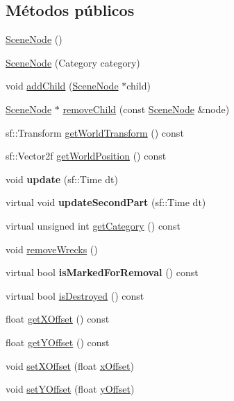 \subsection*{Métodos públicos}
\begin{DoxyCompactItemize}
\item 
\hyperlink{classSceneNode_acc2e7940323560ba86dad8e2d6eb6690}{Scene\+Node} ()
\item 
\hyperlink{classSceneNode_af87e82dcbe9fc195a557bc91a4b16317}{Scene\+Node} (Category category)
\item 
void \hyperlink{classSceneNode_a0e5790af868dcf846f37630094850fd7}{add\+Child} (\hyperlink{classSceneNode}{Scene\+Node} $\ast$child)
\item 
\hyperlink{classSceneNode}{Scene\+Node} $\ast$ \hyperlink{classSceneNode_a6fe848553acf7282b1faf6aaad3eb1b8}{remove\+Child} (const \hyperlink{classSceneNode}{Scene\+Node} \&node)
\item 
sf\+::\+Transform \hyperlink{classSceneNode_a88be3d3c93c80ee4a7ba25024d2414ec}{get\+World\+Transform} () const 
\item 
sf\+::\+Vector2f \hyperlink{classSceneNode_a410150636d06294c7a9e238d8c4f07b5}{get\+World\+Position} () const 
\item 
\hypertarget{classSceneNode_a132fa45a0a23ba86b76247273a16cfce}{}void {\bfseries update} (sf\+::\+Time dt)\label{classSceneNode_a132fa45a0a23ba86b76247273a16cfce}

\item 
\hypertarget{classSceneNode_a6c42640df0126ae10c4fa02d3bbfd509}{}virtual void {\bfseries update\+Second\+Part} (sf\+::\+Time dt)\label{classSceneNode_a6c42640df0126ae10c4fa02d3bbfd509}

\item 
virtual unsigned int \hyperlink{classSceneNode_a46b4d2304c0e3e8e18235959f51689d9}{get\+Category} () const 
\item 
void \hyperlink{classSceneNode_a4ab07dfa68f4094e2e9152b6f4869794}{remove\+Wrecks} ()
\item 
\hypertarget{classSceneNode_a7c07379dc7bd3165843607beb6287ef9}{}virtual bool {\bfseries is\+Marked\+For\+Removal} () const \label{classSceneNode_a7c07379dc7bd3165843607beb6287ef9}

\item 
virtual bool \hyperlink{classSceneNode_a2299b0d13e03f162adfd560bc29da734}{is\+Destroyed} () const 
\item 
float \hyperlink{classSceneNode_afb5602a1256e41b0375e8723368a05af}{get\+X\+Offset} () const 
\item 
float \hyperlink{classSceneNode_a8e8b4174abf121a96a2c950a9fbc001c}{get\+Y\+Offset} () const 
\item 
void \hyperlink{classSceneNode_a93362a6a508d77212c788bbf17814f96}{set\+X\+Offset} (float \hyperlink{classSceneNode_ad7b83da569e61908f0e828c11549610f}{x\+Offset})
\item 
void \hyperlink{classSceneNode_a0248f3ff0c2f90fd8464a87c13d90494}{set\+Y\+Offset} (float \hyperlink{classSceneNode_ac2e7bda67762d356a06386e271f41c23}{y\+Offset})
\end{DoxyCompactItemize}
